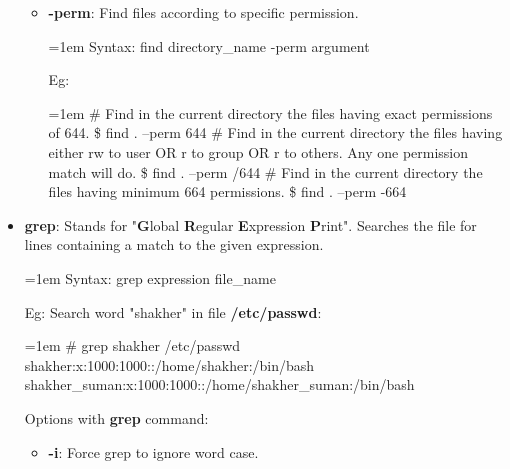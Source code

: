 \begin{flushleft}
\begin{itemize}
\begin{itemize}
			\item \textbf{-perm}: Find files according to specific permission.
			\bigskip
			\begin{tcolorbox}[breakable,notitle,boxrule=-0pt,colback=pink,colframe=pink]
				\color{black}
				\font=1em
				Syntax: find directory\_name -perm argument
				\font=4pt
			\end{tcolorbox}
			Eg:
			\bigskip
			\begin{tcolorbox}[breakable,notitle,boxrule=-0pt,colback=black,colframe=black]
				\color{white}
				\font=1em
				\color{yellow}
				\# Find in the current directory the files having exact permissions of 644.
				\color{green}
				\newline
				\$ find . –perm 644
				\newline
				\color{yellow}
				\newline
				\# Find in the current directory the files having \color{yellow} either rw to user OR r to group OR r to \color{yellow} others. Any one permission match will do.
				\color{green}
				\newline
				\$ find . –perm /644 
				\newline
				\color{yellow}
				\newline
				\# Find in the current directory the files having minimum 664 permissions.
				\color{green}
				\newline
				\$ find . –perm -664
				\font=4pt
			\end{tcolorbox}		
		\end{itemize}
		
		\newpage
		\item \textbf{grep}: Stands for "\textbf{G}lobal \textbf{R}egular \textbf{E}xpression \textbf{P}rint". Searches the file for lines containing a match to the given expression.
		\newline
			\begin{tcolorbox}[breakable,notitle,boxrule=-0pt,colback=pink,colframe=pink]
				\color{black}
				\font=1em
				Syntax: grep expression file\_name
				\font=4pt
			\end{tcolorbox}
		Eg: Search word "shakher" in file \textbf{/etc/passwd}:
			\bigskip
			\begin{tcolorbox}[breakable,notitle,boxrule=-0pt,colback=black,colframe=black]
				\color{green}
				\font=1em
				\# grep shakher /etc/passwd
				\newline
				\color{white}
				shakher:x:1000:1000::/home/shakher:/bin/bash
				\newline
				shakher\_suman:x:1000:1000::/home/shakher\_suman:/bin/bash
				\font=4pt
			\end{tcolorbox}
		Options with \textbf{grep} command:
		\begin{itemize}
			\item \textbf{-i}: Force grep to ignore word case.
			\bigskip
			

\end{itemize}
\end{itemize}
\end{flushleft}
